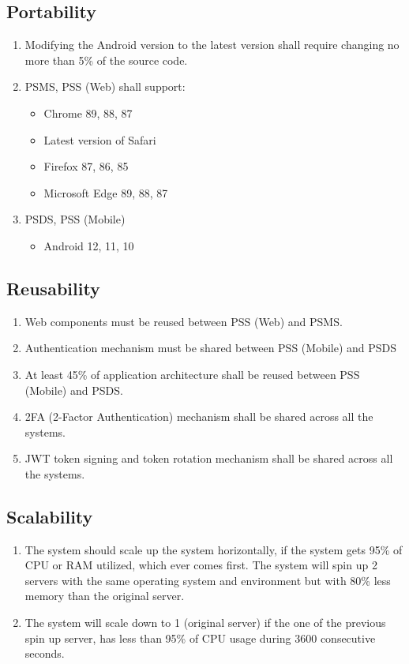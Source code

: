 \subsection{Portability}
\begin{enumerate}[label=POR-\arabic*]
    \item Modifying the Android version to the latest version shall require 
    changing no more than 5\% of the source code.
    \item PSMS, PSS (Web) shall support:
    \begin{itemize}
        \item Chrome 89, 88, 87
        \item Latest version of Safari
        \item Firefox 87, 86, 85
        \item Microsoft Edge 89, 88, 87
    \end{itemize}
    \item PSDS, PSS (Mobile)
    \begin{itemize}
        \item Android 12, 11, 10
    \end{itemize}
\end{enumerate}
\pagebreak
\subsection{Reusability}
\begin{enumerate}[label=REU-\arabic*]
    \item Web components must be reused between PSS (Web) and PSMS.
    \item Authentication mechanism must be shared between PSS (Mobile) and PSDS
    \item At least 45\% of application architecture shall be reused 
    between PSS (Mobile) and PSDS.
    \item 2FA (2-Factor Authentication) mechanism shall be shared across 
    all the systems.
    \item JWT token signing and token rotation mechanism shall be shared 
    across all the systems.
\end{enumerate}

\subsection{Scalability}
\begin{enumerate}[label=SCA-\arabic*]
    \item The system should scale up the system horizontally, if the system 
    gets 95\% of CPU or RAM utilized, which ever comes first. The system will 
    spin up 2 servers with the same operating system and environment 
    but with 80\% less memory than the original server.
    \item The system will scale down to 1 (original server) if the one of the 
    previous spin up server, has less than 95\% of CPU usage during 3600 
    consecutive seconds.
\end{enumerate}

